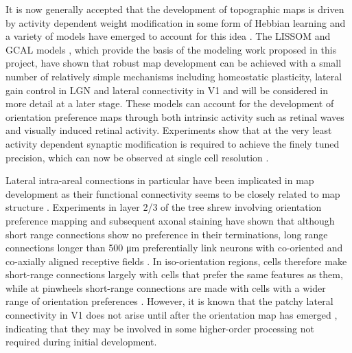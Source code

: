 It is now generally accepted that the development of topographic maps
is driven by activity dependent weight modification in some form of
Hebbian learning \citep{Shatz1996} and a variety of models have
emerged to account for this idea \citep{Bienenstock1982,
  Miller1989}. The LISSOM and GCAL models \citep{Bednar2003,
  Stevens2013}, which provide the basis of the modeling work proposed
in this project, have shown that robust map development can be
achieved with a small number of relatively simple mechanisms including
homeostatic plasticity, lateral gain control in LGN and lateral
connectivity in V1 \citep{Stevens2013} and will be considered in more
detail at a later stage. These models can account for the development
of orientation preference maps through both intrinsic activity such as
retinal waves \citep{Bednar2003} and visually induced retinal
activity. Experiments show that at the very least activity dependent
synaptic modification is required to achieve the finely tuned
precision, which can now be observed at single cell resolution
\citep{Ohki2005,White2007}.

Lateral intra-areal connections in particular have been implicated in
map development as their functional connectivity seems to be closely
related to map structure \citep{Gilbert1983}. Experiments in layer 2/3
of the tree shrew involving orientation preference mapping and
subsequent axonal staining have shown that although short range
connections show no preference in their terminations, long range
connections longer than 500 \si{\micro\metre} preferentially link
neurons with co-oriented and co-axially aligned receptive fields
\citep{Bosking1997}. In iso-orientation regions, cells therefore make
short-range connections largely with cells that prefer the same
features as them, while at pinwheels short-range connections are made
with cells with a wider range of orientation preferences
\citep{Yousef2001}. However, it is known that the patchy lateral
connectivity in V1 does not arise until after the orientation map has
emerged \citep{Ruthazer1996}, indicating that they may be involved in
some higher-order processing not required during initial development.

